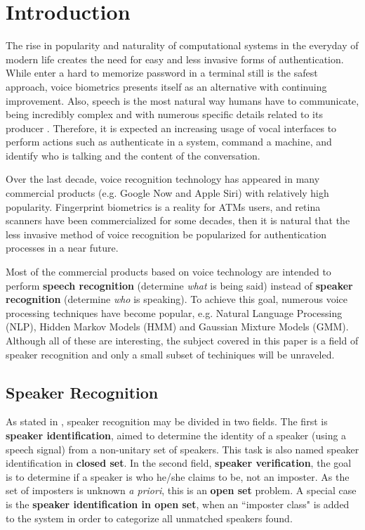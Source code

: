 \chapter{Introduction}

The rise in popularity and naturality of computational systems in the everyday of modern life creates the need for easy and less invasive forms of authentication. While enter a hard to memorize password in a terminal still is the safest approach, voice biometrics presents itself as an alternative with continuing improvement. Also, speech is the most natural way humans have to communicate, being incredibly complex and with numerous specific details related to its producer \autocite{bimbot.et.al.2004}. Therefore, it is expected an increasing usage of vocal interfaces to perform actions such as authenticate in a system, command a machine, and identify who is talking and the content of the conversation.

Over the last decade, voice recognition technology has appeared in many commercial products (e.g. Google Now and Apple Siri) with relatively high popularity. Fingerprint biometrics is a reality for ATMs users, and retina scanners have been commercialized for some decades, then it is natural that the less invasive method of voice recognition be popularized for authentication processes in a near future.

Most of the commercial products based on voice technology are intended to perform \textbf{speech recognition} (determine \emph{what} is being said) instead of \textbf{speaker recognition} (determine \emph{who} is speaking). To achieve this goal, numerous voice processing techniques have become popular, e.g. Natural Language Processing (NLP), Hidden Markov Models (HMM) and Gaussian Mixture Models (GMM). Although all of these are interesting, the subject covered in this paper is a field of speaker recognition and only a small subset of techiniques will be unraveled.

\section{Speaker Recognition}

As stated in \autocite{pinheiro.2013}, speaker recognition may be divided in two fields. The first is \textbf{speaker identification}, aimed to determine the identity of a speaker (using a speech signal) from a non-unitary set of speakers. This task is also named speaker identification in \textbf{closed set}. In the second field, \textbf{speaker verification}, the goal is to determine if a speaker is who he/she claims to be, not an imposter. As the set of imposters is unknown \emph{a priori}, this is an \textbf{open set} problem. A special case is the \textbf{speaker identification in open set}, when an ``imposter class" is added to the system in order to categorize all unmatched speakers found.

